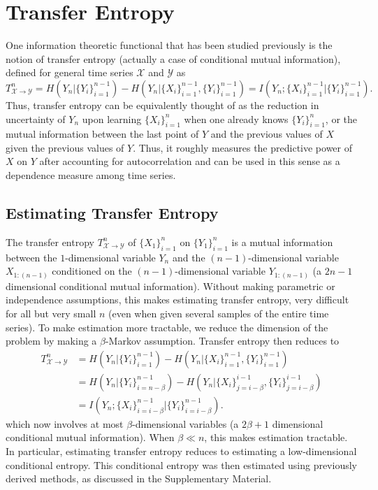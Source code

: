 \documentclass{article} %
\newcommand{\X}{\mathcal{X}}                        %
\newcommand{\Y}{\mathcal{Y}}                        %
\begin{document}

\section{Transfer Entropy}
\label{sec:TE}
One information theoretic functional that has been studied previously is the
notion of transfer entropy (actually a case of conditional mutual information),
defined for general time series $\X$ and $\Y$ as
\[T_{\X \to \Y}^n
    = H(Y_n | \{Y_i\}_{i = 1}^{n - 1}) - H(Y_n | \{X_i\}_{i = 1}^{n - 1}, \{Y_i\}_{i = 1}^{n - 1})
    = I(Y_n; \{X_i\}_{i = 1}^{n - 1} | \{Y_i\}_{i = 1}^{n - 1}).
\]
Thus, transfer entropy can be equivalently thought of as the reduction in
uncertainty of $Y_n$ upon learning $\{X_i\}_{i = 1}^n$ when one already knows
$\{Y_i\}_{i = 1}^n$, or the mutual information between the last point of $Y$
and the previous values of $X$ given the previous values of $Y$. Thus, it
roughly measures the predictive power of $X$ on $Y$ after accounting for
autocorrelation and can be used in this sense as a dependence measure among
time series.

\subsection{Estimating Transfer Entropy}
The transfer entropy $T_{\X \to \Y}^n$ of $\{X_1\}_{i = 1}^n$ on
$\{Y_1\}_{i = 1}^n$ is a mutual information between the $1$-dimensional
variable $Y_n$ and the $(n - 1)$-dimensional variable $X_{1:(n - 1)}$
conditioned on the $(n - 1)$-dimensional variable $Y_{1:(n - 1)}$ (a $2n - 1$
dimensional conditional mutual information). Without making parametric or
independence assumptions, this makes estimating transfer entropy, very
difficult for all but very small $n$ (even when given several samples of the
entire time series). To make estimation more tractable, we reduce the dimension
of the problem by making a $\beta$-Markov assumption.
Transfer entropy then reduces to
\begin{align*}
T_{\X \to \Y}^n
 &  = H(Y_n | \{Y_i\}_{i = 1}^{n - 1})
        - H(Y_n | \{X_i\}_{i = 1}^{n - 1}, \{Y_i\}_{i = 1}^{n - 1}) \\
 &  = H(Y_n | \{Y_i\}_{i = n - \beta}^{n - 1})
        - H(Y_n | \{X_i\}_{j = i - \beta}^{i - 1}, \{Y_i\}_{j = i - \beta}^{i - 1}) \\
 &  = I(Y_n; \{X_i\}_{i = i - \beta}^{n - 1}
                                            | \{Y_i\}_{i = i - \beta}^{n - 1}).
\end{align*}
which now involves at most $\beta$-dimensional variables (a $2\beta + 1$
dimensional conditional mutual information). When $\beta \ll n$, this makes
estimation tractable. In particular, estimating transfer entropy reduces to
estimating a low-dimensional conditional entropy. This conditional entropy was
then estimated using previously derived methods, as discussed in the
Supplementary Material.
\end{document}
